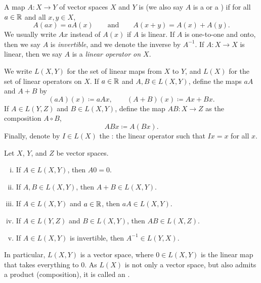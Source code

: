 \begin{defn}
A map $A \colon X \to Y$ of vector spaces $X$ and $Y$
is \emph{} (we also say $A$ is a
\emph{}
or a \emph{})
if for all $a \in {\mathbb{R}}$ and all $x,y \in X$,
\begin{equation*}
A(a x) = a A(x) \qquad \text{and} \qquad A(x+y) = A(x)+A(y) .
\end{equation*}
We usually write $Ax$ instead of $A(x)$ if $A$ is linear.
If $A$ is one-to-one and onto, then we say $A$ is
\emph{invertible},
and we denote the inverse by $A^{-1}$.
If $A \colon X \to X$ is linear, then we say $A$ is a
\emph{linear operator on $X$}.

We write $L(X,Y)$ for the set of linear maps from $X$ to
$Y$, and $L(X)$ for the set of linear operators on $X$.
If $a \in {\mathbb{R}}$ and $A,B \in L(X,Y)$, define
the maps $aA$ and $A+B$ by
\begin{equation*}
(aA)(x) \coloneqq aAx ,
\qquad
(A+B)(x) \coloneqq Ax + Bx .
\end{equation*}
If $A \in L(Y,Z)$ and $B \in L(X,Y)$, define the
map $AB \colon X \to Z$ as the composition $A \circ B$,
\begin{equation*}
ABx \coloneqq A(Bx) .
\end{equation*}
Finally, denote by $I \in L(X)$ the \emph{}: 
the linear operator such that $Ix = x$ for all $x$.
\end{defn}

\begin{prop} \label{prop:LXYvs}
Let $X$, $Y$, and $Z$ be vector spaces.
\begin{enumerate}[(i)]
\item If $A \in L(X,Y)$, then $A0 = 0$.
\item If $A,B \in L(X,Y)$, then $A+B \in L(X,Y)$.
\item If $A \in L(X,Y)$ and $a \in {\mathbb{R}}$, then $aA \in L(X,Y)$.
\item If $A \in L(Y,Z)$ and $B \in L(X,Y)$, then $AB \in L(X,Z)$. 
\item If $A \in L(X,Y)$ is invertible, then $A^{-1} \in L(Y,X)$.
\end{enumerate}
\end{prop}

In particular, $L(X,Y)$ is a vector space, where $0 \in L(X,Y)$ is the
linear map that takes everything to $0$.
As $L(X)$ is not only a vector space, but also
admits a product (composition),
it is called an \emph{}.

